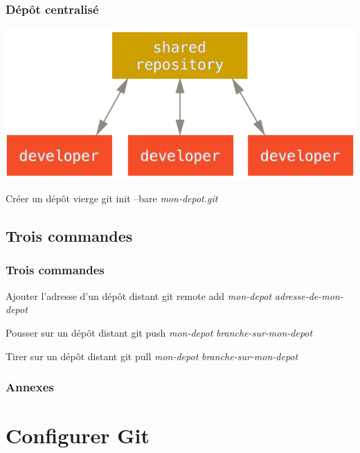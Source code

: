 \documentclass[t,11pt]{beamer}
\begin{document}
\begin{frame}
        \frametitle{D\'ep\^ot centralis\'e}
        \centering
        \includegraphics[width=\linewidth,height=0.8\textheight,keepaspectratio]{./img/centralized_workflow}
        \begin{block}{Cr\'eer un d\'ep\^ot vierge}
                git init --bare \emph{mon-depot.git}
        \end{block}
\end{frame}

\subsection{Trois commandes}

\begin{frame}
        \frametitle{Trois commandes}
        \begin{block}{Ajouter l'adresse d'un d\'ep\^ot distant}
                git remote add \emph{mon-depot} \emph{adresse-de-mon-depot}
        \end{block}
        \begin{block}{Pousser sur un d\'ep\^ot distant}
                git push \emph{mon-depot} \emph{branche-sur-mon-depot}
        \end{block}
        \begin{block}{Tirer sur un d\'ep\^ot distant}
                git pull \emph{mon-depot} \emph{branche-sur-mon-depot}
        \end{block}
\end{frame}

\appendix
\begin{frame}[c]
        \frametitle{Annexes}
        \tableofcontents[hideallsubsections]
\end{frame}

\section{Configurer Git}
\end{document}
